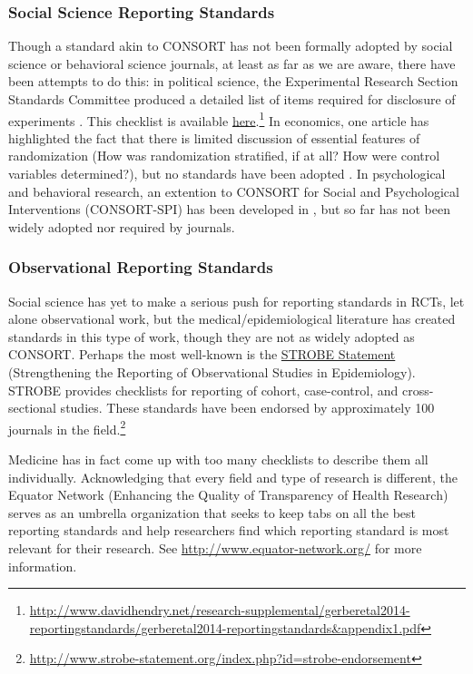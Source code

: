 \documentclass[12pt] {article}
\begin{document}
\subsubsection{Social Science Reporting Standards}\label{soc-sci-standards}
Though a standard akin to CONSORT has not been formally adopted by social science or behavioral science journals, at least as far as we are aware, there have been attempts to do this: in political science, the Experimental Research Section Standards Committee produced a detailed list of items required for disclosure of experiments \citep{gerber_reporting_????}. This checklist is available \href{http://www.davidhendry.net/research-supplemental/gerberetal2014-reportingstandards/gerberetal2014-reportingstandards&appendix1.pdf}{here}.\footnote{\url{http://www.davidhendry.net/research-supplemental/gerberetal2014-reportingstandards/gerberetal2014-reportingstandards&appendix1.pdf}} In economics, one article has highlighted the fact that there is limited discussion of essential features of randomization (How was randomization stratified, if at all? How were control variables determined?), but no standards have been adopted \citep{bruhn_pursuit_2009}. In psychological and behavioral research, an extention to CONSORT for Social and Psychological Interventions (CONSORT-SPI) has been developed in \citep{montgomery2013protocol}, but so far has not been widely adopted nor required by journals. 

\subsubsection{Observational Reporting Standards}\label{observational-standards}
Social science has yet to make a serious push for reporting standards in RCTs, let alone observational work, but the medical/epidemiological literature has created standards in this type of work, though they are not as widely adopted as CONSORT. Perhaps the most well-known is the \href{http://www.strobe-statement.org}{STROBE Statement} (Strengthening the Reporting of Observational Studies in Epidemiology)\citep{strobestatement2007}. STROBE provides checklists for reporting of cohort, case-control, and cross-sectional studies. These standards have been endorsed by approximately 100 journals in the field.\footnote{\url{http://www.strobe-statement.org/index.php?id=strobe-endorsement}}

Medicine has in fact come up with too many checklists to describe them all individually. Acknowledging that every field and type of research is different, the Equator Network (Enhancing the Quality of Transparency of Health Research) serves as an umbrella organization that seeks to keep tabs on all the best reporting standards and help researchers find which reporting standard is most relevant for their research. See \url{http://www.equator-network.org/} for more information.
\end{document}
